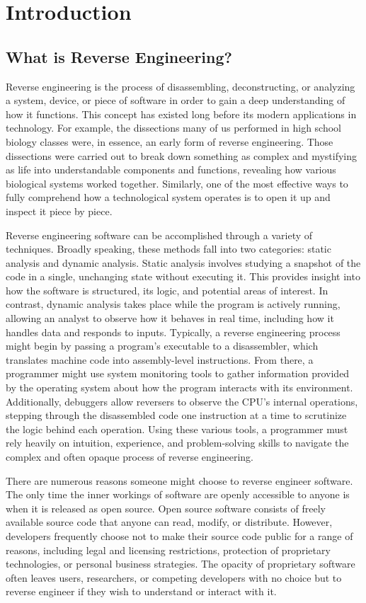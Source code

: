 \chapter{Introduction}\label{intro}
\section{What is Reverse Engineering?}

Reverse engineering is the process of disassembling, deconstructing, or analyzing a system, device, or piece of software in order to gain a deep understanding of how it functions. This concept has existed long before its modern applications in technology. For example, the dissections many of us performed in high school biology classes were, in essence, an early form of reverse engineering. Those dissections were carried out to break down something as complex and mystifying as life into understandable components and functions, revealing how various biological systems worked together. Similarly, one of the most effective ways to fully comprehend how a technological system operates is to open it up and inspect it piece by piece.

Reverse engineering software can be accomplished through a variety of techniques. Broadly speaking, these methods fall into two categories: static analysis and dynamic analysis. Static analysis involves studying a snapshot of the code in a single, unchanging state without executing it. This provides insight into how the software is structured, its logic, and potential areas of interest. In contrast, dynamic analysis takes place while the program is actively running, allowing an analyst to observe how it behaves in real time, including how it handles data and responds to inputs. Typically, a reverse engineering process might begin by passing a program’s executable to a disassembler, which translates machine code into assembly-level instructions. From there, a programmer might use system monitoring tools to gather information provided by the operating system about how the program interacts with its environment. Additionally, debuggers allow reversers to observe the CPU’s internal operations, stepping through the disassembled code one instruction at a time to scrutinize the logic behind each operation. Using these various tools, a programmer must rely heavily on intuition, experience, and problem-solving skills to navigate the complex and often opaque process of reverse engineering.

There are numerous reasons someone might choose to reverse engineer software. The only time the inner workings of software are openly accessible to anyone is when it is released as open source. Open source software consists of freely available source code that anyone can read, modify, or distribute. However, developers frequently choose not to make their source code public for a range of reasons, including legal and licensing restrictions, protection of proprietary technologies, or personal business strategies. The opacity of proprietary software often leaves users, researchers, or competing developers with no choice but to reverse engineer if they wish to understand or interact with it.

